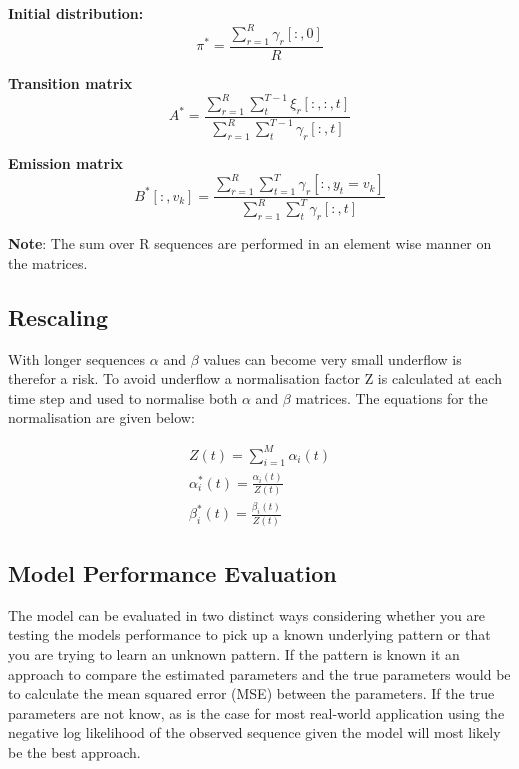\textbf{Initial distribution:}
\begin{equation}
    \pi^* = \frac{\sum_{r=1}^R\gamma_r[:,0]}{R}
\end{equation}

\textbf{Transition matrix}
\begin{equation}
    A^* = \frac{\sum_{r=1}^R\sum_t^{T-1} \xi_r[:,:,t]}{\sum_{r=1}^R\sum_t^{T-1} \gamma_r[:,t]} 
\end{equation}

\textbf{Emission matrix}
\begin{equation}
    B^*[:,v_k] =  \frac{\sum_{r=1}^R \sum_{t=1}^{T} \gamma_r[:,y_t=v_k]}{ \sum_{r=1}^R \sum_t^{T} \gamma_r[:,t]}
\end{equation}

\textbf{Note}: The sum over R sequences are performed in an element wise manner on the matrices.

\subsection{Rescaling}

With longer sequences $\alpha$ and $\beta$ values can become very small underflow is therefor a risk. To avoid underflow a normalisation factor Z is calculated at each time step and used to normalise both $\alpha$ and $\beta$ matrices. The equations for the normalisation are given below:

\begin{align}
    Z(t) = \sum_{i=1}^M \alpha_i(t) \\
    \alpha^*_i(t) = \frac{\alpha_i(t)}{Z(t)} \\
    \beta^*_i(t) = \frac{\beta_i(t)}{Z(t)}
\end{align}


\subsection{Model Performance Evaluation}

The model can be evaluated in two distinct ways considering whether you are testing the models performance to pick up a known underlying pattern or that you are trying to learn an unknown pattern. If the pattern is known it an approach to compare the estimated parameters and the true parameters would be to calculate the mean squared error (MSE) between the parameters. If the true parameters are not know, as is the case for most real-world application using the negative log likelihood of the observed sequence given the model will most likely be the best approach. 

